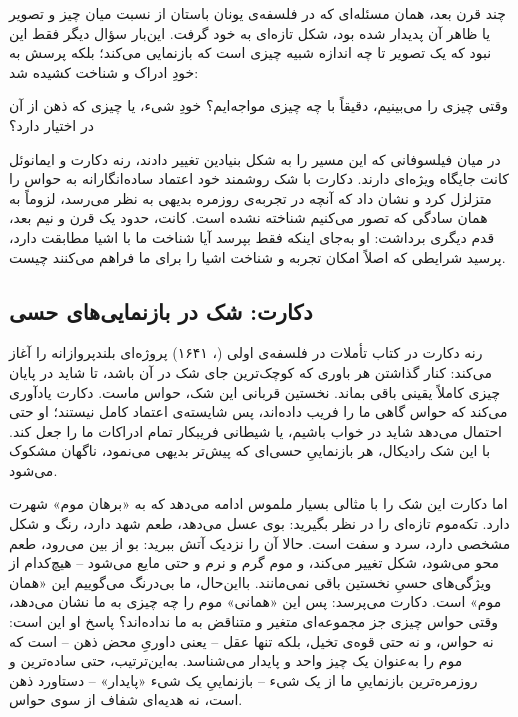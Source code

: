 چند قرن بعد، همان مسئله‌ای که در فلسفه‌ی یونان باستان از نسبت میان چیز و تصویر یا ظاهر آن پدیدار شده بود، شکل تازه‌ای به خود گرفت. این‌بار سؤال دیگر فقط این نبود که یک تصویر تا چه اندازه شبیه چیزی است که بازنمایی می‌کند؛ بلکه پرسش به خودِ ادراک و شناخت کشیده شد:

وقتی چیزی را می‌بینیم، دقیقاً با چه چیزی مواجه‌ایم؟ خودِ شیء، یا چیزی که ذهن از آن در اختیار دارد؟

در میان فیلسوفانی که این مسیر را به شکل بنیادین تغییر دادند، رنه دکارت و ایمانوئل کانت جایگاه ویژه‌ای دارند. دکارت با شک روشمند خود اعتماد ساده‌انگارانه به حواس را متزلزل کرد و نشان داد که آنچه در تجربه‌ی روزمره بدیهی به نظر می‌رسد، لزوماً به همان سادگی که تصور می‌کنیم شناخته نشده است. کانت، حدود یک قرن و نیم بعد، قدم دیگری برداشت: او به‌جای اینکه فقط بپرسد آیا شناخت ما با اشیا مطابقت دارد، پرسید شرایطی که اصلاً امکان تجربه و شناخت اشیا را برای ما فراهم می‌کنند چیست.

\subsection{دکارت: شک در بازنمایی‌های حسی}
\label{sub:descartes-doubt}

رنه دکارت در کتاب تأملات در فلسفه‌ی اولی (، ۱۶۴۱) پروژه‌ای بلندپروازانه را آغاز می‌کند: کنار گذاشتن هر باوری که کوچک‌ترین جای شک در آن باشد، تا شاید در پایان چیزی کاملاً یقینی باقی بماند. نخستین قربانی این شک، حواس ماست. دکارت یادآوری می‌کند که حواس گاهی ما را فریب داده‌اند، پس شایسته‌ی اعتماد کامل نیستند؛ او حتی احتمال می‌دهد شاید در خواب باشیم، یا شیطانی فریبکار تمام ادراکات ما را جعل کند. با این شک رادیکال، هر بازنماییِ حسی‌ای که پیش‌تر بدیهی می‌نمود، ناگهان مشکوک می‌شود\autocite{descartes-meditations}.

اما دکارت این شک را با مثالی بسیار ملموس ادامه می‌دهد که به «برهان موم» شهرت دارد. تکه‌موم تازه‌ای را در نظر بگیرید: بوی عسل می‌دهد، طعم شهد دارد، رنگ و شکل مشخصی دارد، سرد و سفت است. حالا آن را نزدیک آتش ببرید: بو از بین می‌رود، طعم محو می‌شود، شکل تغییر می‌کند، و موم گرم و نرم و حتی مایع می‌شود -- هیچ‌کدام از ویژگی‌های حسیِ نخستین باقی نمی‌مانند. بااین‌حال، ما بی‌درنگ می‌گوییم این «همان موم» است. دکارت می‌پرسد: پس این «همانی» موم را چه چیزی به ما نشان می‌دهد، وقتی حواس چیزی جز مجموعه‌ای متغیر و متناقض به ما نداده‌اند؟ پاسخ او این است: نه حواس، و نه حتی قوه‌ی تخیل، بلکه تنها عقل -- یعنی داوریِ محض ذهن -- است که موم را به‌عنوان یک چیز واحد و پایدار می‌شناسد\autocite{descartes-meditations}. به‌این‌ترتیب، حتی ساده‌ترین و روزمره‌ترین بازنماییِ ما از یک شیء -- بازنماییِ یک شیء «پایدار» -- دستاورد ذهن است، نه هدیه‌ای شفاف از سوی حواس.

